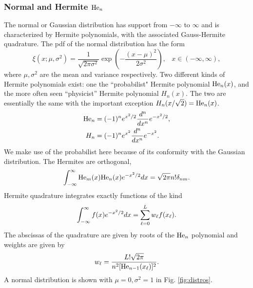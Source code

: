 \subsubsection{Normal and Hermite $\mbox{He}_n$}
The normal or Gaussian distribution has support from $-\infty$ to $\infty$ and is characterized by Hermite polynomials, with the associated Gauss-Hermite quadrature.  The pdf of the normal distribution has the form
\begin{equation}
\xi(x;\mu,\sigma^2)=\frac{1}{\sqrt{2\pi\sigma^2}}\exp\left(-\frac{(x-\mu)^2}{2\sigma^2}\right),
      \hspace{10pt} x\in(-\infty,\infty),
\end{equation}
where $\mu,\sigma^2$ are the mean and variance respectively.  Two different kinds of Hermite polynomials exist: one the ``probabilist" Hermite polynomial $\mbox{He}_n(x)$, and the more often seen ``physicist'' Hermite polynomial $H_n(x)$.  The two are essentially the same with the important exception $H_n(x/\sqrt{2})=\mbox{He}_n(x)$.
\begin{align}
\mbox{He}_n&=(-1)^n e^{x^2/2}\frac{d^n}{dx^n}e^{-x^2/2},\\
H_n&=(-1)^n e^{x^2}\frac{d^n}{dx^n}e^{-x^2}.
\end{align}
We make use of the probabilist here because of its conformity with the Gaussian distribution.  The Hermites are orthogonal,
\begin{equation}
\int_{-\infty}^\infty \mbox{He}_m(x)\mbox{He}_n(x) e^{-x^2/2}dx=\sqrt{2\pi} n! \delta_{nm}.
\end{equation}
Hermite quadrature integrates exactly functions of the kind
\begin{equation}
\int_{-\infty}^\infty f(x)e^{-x^2/2}dx=\sum_{\ell=0}^L w_\ell f(x_\ell).
\end{equation}
The abscissas of the quadrature are given by roots of the $\mbox{He}_n$ polynomial and weights are given by
\begin{equation}
w_\ell = \frac{L!\sqrt{2\pi}}{n^2[\mbox{He}_{n-1}(x_\ell)]^2}.
\end{equation}
A normal distribution is shown with $\mu=0,\sigma^2=1$ in Fig. \ref{fig:distros}.

\newpage
